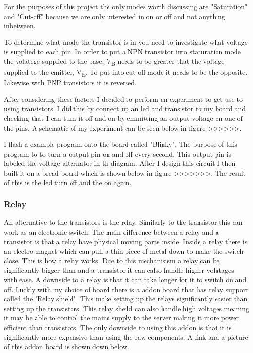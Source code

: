 \documentclass{article}
\begin{document}
For the purposes of this project the only modes worth discussing are "Saturation" and "Cut-off" because we
are only interested in on or off and not anything inbetween. 

To determine what mode the transistor is in you need to investigate what voltage is supplied to each pin.
In order to put a NPN transistor into staturation mode the volatege supplied to the base, V\textsubscript{B}
needs to be greater that the voltage supplied to the emitter, V\textsubscript{E}. To put into cut-off mode
it needs to be the opposite. Likewise with PNP transistors it is reversed.

After considering these factors I decided to perform an experiment to get use to using transistors. I did
this by connect up an led and transistor to my board and checking that I can turn it off and on by emmitting
an output voltage on one of the pins. A schematic of my experiment can be seen below in figure >>>>>>.



I flash a example program onto the board called "Blinky". The purpose of this program to to turn a output
pin on and off every second. This output pin is labeled the voltage alternator in th diagram. After I
design this circuit I then built it on a bread board which is shown below in figure >>>>>>>. The result
of this is the led turn off and the on again.

\subsubsection{Relay}

An alternative to the transistors is the relay. Similarly to the transistor this can work as an electronic
switch. The main difference between a relay and a transistor is that a relay have physical moving parts
inside. Inside a relay there is an electro magnet which can pull a thin piece of metal down to make the 
switch close. This is how a relay works. Due to this mechanisism a relay can be significantly bigger than
and a transistor it can calso handle higher volatages with ease. A downside to a relay is that it can
take longer for it to switch on and off. Luckly with my choice of board there is a addon board that has
relay support called the "Relay shield". This make setting up the relays significantly easier than setting
up the transistors. This relay sheild can also handle high voltages meaning it may be able to control the
mains supply to the server making it more power efficient than transistors. The only downside to using this
addon is that it is significantly more expensive than using the raw components. A link and a picture of this
addon board is shown down below.
\end{document}

